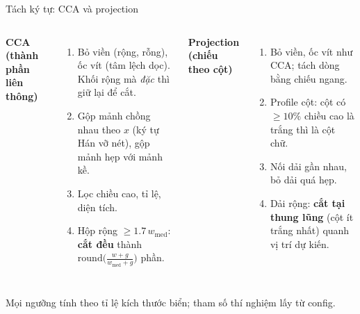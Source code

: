 \documentclass[aspectratio=169,11pt]{beamer}
\newcommand{\hl}[1]{\textcolor{accentdark}{\textbf{#1}}}
\begin{document}
\begin{frame}{Tách ký tự: CCA và projection}
  \begin{columns}[T]
    {\bfseries\color{accentdark}CCA (thành phần liên thông)}
    \begin{enumerate}
      \item Bỏ viền (rộng, rỗng), ốc vít (tâm lệch dọc). Khối rộng mà \emph{đặc} thì giữ lại để cắt.
      \item Gộp mảnh chồng nhau theo $x$ (ký tự Hán vỡ nét), gộp mảnh hẹp với mảnh kề.
      \item Lọc chiều cao, tỉ lệ, diện tích.
      \item Hộp rộng $\ge1.7\,w_{\mathrm{med}}$: \hl{cắt đều} thành $\mathrm{round}\big(\tfrac{w+g}{w_{\mathrm{med}}+g}\big)$ phần.
    \end{enumerate}
    {\bfseries\color{accentdark}Projection (chiếu theo cột)}
    \begin{enumerate}
      \item Bỏ viền, ốc vít như CCA; tách dòng bằng chiếu ngang.
      \item Profile cột: cột có $\ge10\%$ chiều cao là trắng thì là cột chữ.
      \item Nối dải gần nhau, bỏ dải quá hẹp.
      \item Dải rộng: \hl{cắt tại thung lũng} (cột ít trắng nhất) quanh vị trí dự kiến.
    \end{enumerate}
  \end{columns}
  \vspace{2mm}
  {\small\color{muted} Mọi ngưỡng tính theo tỉ lệ kích thước biển; tham số thí nghiệm lấy từ config.}
\end{frame}
\end{document}
